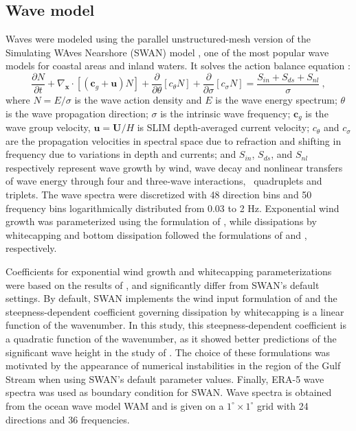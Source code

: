 \subsection{Wave model}
Waves were modeled using the parallel unstructured-mesh version of the Simulating WAves Nearshore (SWAN) model \citep{booij1999third}, one of the most popular wave models for coastal areas and inland waters. It solves the action balance equation \citep{mei1989applied}:
\begin{equation}
    \dfrac{\partial N}{\partial t} + \nabla_\mathbf{x}\cdot[(\mathbf{c}_g+\mathbf{u})N] + \dfrac{\partial }{\partial \theta}[c_\theta N] + \dfrac{\partial}{\partial \sigma}[c_\sigma N] = \dfrac{S_{in}+S_{ds}+S_{nl}}{\sigma}~, \label{eq:swan}
\end{equation}
where $N=E/\sigma$ is the wave action density and $E$ is the wave energy spectrum; $\theta$ is the wave propagation direction; $\sigma$ is the intrinsic wave frequency; $\mathbf{c}_g$ is the wave group velocity, $\mathbf{u}=\mathbf{U}/H$ is SLIM depth-averaged current velocity; $c_\theta$ and $c_\sigma$ are the propagation velocities in spectral space due to refraction and shifting in frequency due to variations in depth and currents; and $S_{in}$, $S_{ds}$, and $S_{nl}$ respectively represent wave growth by wind, wave decay and nonlinear transfers of wave energy through four and three-wave interactions, \ie~quadruplets and triplets. The wave spectra were discretized with 48 direction bins and 50 frequency bins logarithmically distributed from 0.03 to 2 Hz. Exponential wind growth was parameterized using the formulation of \cite{janssen1991quasi}, while dissipations by whitecapping and bottom dissipation followed the formulations of \cite{komen1984existence} and \cite{madsen1989spectral}, respectively.

Coefficients for exponential wind growth and whitecapping parameterizations were based on the results of \cite{siadatmousavi2011evaluation}, and significantly differ from SWAN's default settings. By default, SWAN implements the wind input formulation of \cite{komen1984existence} and the steepness-dependent coefficient governing dissipation by whitecapping is a linear function of the wavenumber. In this study, this steepness-dependent coefficient is a quadratic function of the wavenumber, as it showed better predictions of the significant wave height in the study of \cite{siadatmousavi2011evaluation}. The choice of these formulations was motivated by the appearance of numerical instabilities in the region of the Gulf Stream when using SWAN's default parameter values. Finally, ERA-5 wave spectra was used as boundary condition for SWAN. Wave spectra is obtained from the ocean wave model WAM and is given on a $1^\circ \times 1^\circ$ grid with 24 directions and 36 frequencies.

